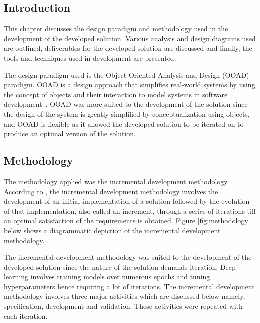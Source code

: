 \documentclass[12pt, a4paper]{article}
\begin{document}
\subsection{Introduction}
This chapter discusses the design paradigm and methodology used in the development of the developed solution. Various analysis and design diagrams used are outlined, deliverables for the developed solution are discussed and finally, the tools and techniques used in development are presented.

The design paradigm used is the Object-Oriented Analysis and Design (OOAD) paradigm. OOAD is a design approach that simplifies real-world systems by using the concept of objects and their interaction to model systems in software development~\citep{nerson1992applying}. OOAD was more suited to the development of the solution since the design of the system is greatly simplified by conceptualization using objects, and OOAD is flexible as it allowed the developed solution to be iterated on to produce an optimal version of the solution.
\subsection{Methodology}
The methodology applied was the incremental development methodology. According to \cite{sommerville2011software}, the incremental development methodology involves the development of an initial implementation of a solution followed by the evolution of that implementation, also called an increment, through a series of iterations till an optimal satisfaction of the requirements is obtained. Figure \ref{fig:methodology} below shows a diagrammatic depiction of the incremental development methodology.

The incremental development methodology was suited to the development of the developed solution since the nature of the solution demands iteration. Deep learning involves training models over numerous epochs and tuning hyperparameters hence requiring a lot of iterations. The incremental development methodology involves three major activities which are discussed below namely, specification, development and validation. These activities were repeated with each iteration.
\end{document}
